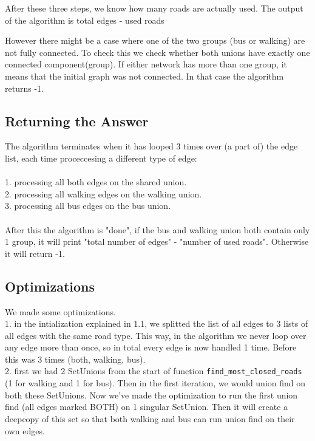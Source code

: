 \documentclass[a4paper]{article}
\begin{document}
After these three steps, we know how many roads are actually used.
The output of the algorithm is total edges - used roads

However there might be a case where one of the two groups (bus or walking) are not fully connected.
To check this we check whether both unions have exactly one connected component(group).
If either network has more than one group, it means that the initial graph was not connected.
In that case the algorithm returns -1.


\subsection{Returning the Answer}
The algorithm terminates when it has looped 3 times over (a part of) the edge list, each time proceccesing a different type of edge:
\\
\\
1. processing all both edges on the shared union.
\\
2. processing all walking edges on the walking union.
\\
3. processing all bus edges on the bus union.
\\
\\
After this the algorithm is "done", if the bus and walking union both contain only 1 group, it will print "total number of edges" - "number of used roads". Otherwise it will return -1.
\subsection{Optimizations}
We made some optimizations.\\1. in the intialization explained in 1.1, we splitted the list of all edges to 3 lists of all edges with the same road type. This way, in the algorithm we never loop over any edge more than once, so in total every edge is now handled 1 time. Before this was 3 times (both, walking, bus).
\\2. first we had 2 SetUnions from the start of function \texttt{find\_most\_closed\_roads} (1 for walking and 1 for bus). Then in the first iteration, we would union find on both these SetUnions. Now we've made the optimization to run the first union find (all edges marked BOTH) on 1 singular SetUnion. Then it will create a deepcopy of this set so that both walking and bus can run union find on their own edges.
\end{document}
